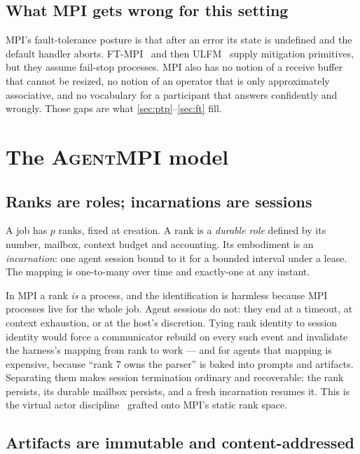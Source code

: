 \documentclass[10pt,twocolumn]{article}
\theoremstyle{definition}
\theoremstyle{plain}
\newcommand{\ampi}{\textsc{AgentMPI}}
\begin{document}
\subsection{What MPI gets wrong for this setting}

MPI's fault-tolerance posture is that after an error its state is undefined and
the default handler aborts. FT-MPI~\cite{fagg00-ftmpi} and then
ULFM~\cite{bouteiller22} supply mitigation primitives, but they assume fail-stop
processes. MPI also has no notion of a receive buffer that cannot be resized, no
notion of an operator that is only approximately associative, and no vocabulary
for a participant that answers confidently and wrongly. Those gaps are what
\cref{sec:ptp}--\cref{sec:ft} fill.

\section{The \ampi{} model}
\label{sec:model}

\subsection{Ranks are roles; incarnations are sessions}

A job has $p$ ranks, fixed at creation. A rank is a \emph{durable role} defined by
its number, mailbox, context budget and accounting. Its embodiment is an
\emph{incarnation}: one agent session bound to it for a bounded interval under a
lease. The mapping is one-to-many over time and exactly-one at any instant.

In MPI a rank \emph{is} a process, and the identification is harmless because MPI
processes live for the whole job. Agent sessions do not: they end at a timeout, at
context exhaustion, or at the host's discretion. Tying rank identity to session
identity would force a communicator rebuild on every such event and invalidate the
harness's mapping from rank to work --- and for agents that mapping is expensive,
because ``rank 7 owns the parser'' is baked into prompts and artifacts. Separating
them makes session termination ordinary and recoverable: the rank persists, its
durable mailbox persists, and a fresh incarnation resumes it. This is the virtual
actor discipline~\cite{bernstein14orleans} grafted onto MPI's static rank space.

\subsection{Artifacts are immutable and content-addressed}
\end{document}
